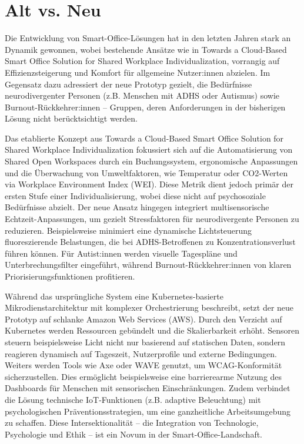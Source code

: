 
\section{Alt vs. Neu}
\label{sec:alt_vs_neu}

Die Entwicklung von Smart-Office-Lösungen hat in den letzten Jahren stark an Dynamik gewonnen, wobei bestehende 
Ansätze wie in \cite{ref01}{Towards a Cloud-Based Smart Office Solution for Shared Workplace Individualization},
vorrangig auf Effizienzsteigerung und Komfort für allgemeine Nutzer:innen abzielen. Im Gegensatz 
dazu adressiert der neue Prototyp gezielt, die Bedürfnisse neurodivergenter Personen (z.B. Menschen mit ADHS 
oder Autismus) sowie Burnout-Rückkehrer:innen – Gruppen, deren Anforderungen in der bisherigen Lösung nicht 
berücktsichtigt werden.

Das etablierte Konzept aus \cite{ref01}{Towards a Cloud-Based Smart Office Solution for Shared Workplace 
Individualization} fokussiert sich auf die Automatisierung von Shared Open Workspaces durch ein Buchungssystem, 
ergonomische Anpassungen und die Überwachung von Umweltfaktoren, wie Temperatur oder CO2-Werten via Workplace 
Environment Index (WEI). Diese Metrik dient jedoch primär der ersten Stufe einer Individualisierung, wobei diese
nicht auf psychosoziale Bedürfnisse abzielt.
Der neue Ansatz hingegen integriert multisensorische Echtzeit-Anpassungen, um gezielt Stressfaktoren für 
neurodivergente Personen zu reduzieren. Beispielsweise minimiert eine dynamische Lichtsteuerung fluoreszierende
Belastungen, die bei ADHS-Betroffenen zu Konzentrationsverlust führen können. Für Autist:innen werden visuelle
Tagespläne und Unterbrechungsfilter eingeführt, während Burnout-Rückkehrer:innen von klaren Priorisierungsfunktionen
profitieren.

Während das ursprüngliche System eine Kubernetes-basierte Mikrodienstarchitektur mit komplexer Orchestrierung
beschreibt, setzt der neue Prototyp auf schlanke Amazon Web Services (AWS). Durch den Verzicht auf Kubernetes 
werden Ressourcen gebündelt und die Skalierbarkeit erhöht. Sensoren steuern beispielsweise Licht nicht nur basierend
auf statischen Daten, sondern reagieren dynamisch auf Tageszeit, Nutzerprofile und externe Bedingungen.
Weiters werden Tools wie Axe oder WAVE genutzt, um WCAG-Konformität sicherzustellen. Dies ermöglicht beispielsweise eine 
barrierearme Nutzung des Dashboards für Menschen mit sensorischen Einschränkungen.
Zudem verbindet die Lösung technische IoT-Funktionen (z.B. adaptive Beleuchtung) mit psychologischen 
Präventionsstrategien, um eine ganzheitliche Arbeitsumgebung zu schaffen. 
Diese Intersektionalität – die Integration von Technologie, Psychologie und Ethik – ist ein Novum in der 
Smart-Office-Landschaft.



